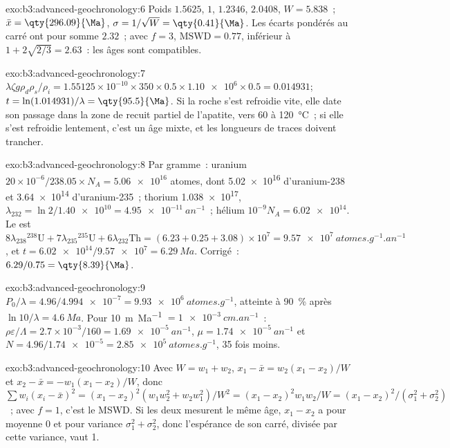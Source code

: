 \begin{solution}{exo:b3:advanced-geochronology:6}
Poids $1.5625$, $1$, $1.2346$, $2.0408$, $W = 5.838$~; $\bar x =
\qty{296.09}{\Ma}$, $\sigma = 1/\sqrt W = \qty{0.41}{\Ma}$. Les écarts pondérés
au carré ont pour somme $2.32$~; avec $f = 3$, $\mathrm{MSWD} = 0.77$, inférieur à
$1 + 2\sqrt{2/3} = 2.63$~: les âges sont compatibles.
\end{solution}

\begin{solution}{exo:b3:advanced-geochronology:7}
$\lambda\zeta g\rho_d\rho_s/\rho_i = 1.55125\times10^{-10}\times350\times0.5
\times\num{1.10e6}\times0.5 = 0.014931$; $t = \ln(1.014931)/\lambda =
\qty{95.5}{\Ma}$. Si la roche s'est refroidie vite, elle date son passage dans la
zone de recuit partiel de l'apatite, vers 60 à \qty{120}{\celsius}~; si elle
s'est refroidie lentement, c'est un âge mixte, et les longueurs de traces doivent trancher.
\end{solution}

\begin{solution}{exo:b3:advanced-geochronology:8}
Par gramme~: uranium $20\times10^{-6}/238.05\times N_A = \num{5.06e16}$ atomes, dont
\num{5.02e16} d'uranium-238 et \num{3.64e14} d'uranium-235~; thorium
\num{1.038e17}, $\lambda_{232} = \ln 2/\num{1.40e10} = \qty{4.95e-11}{an^{-1}}$~;
hélium $10^{-9}N_A = \num{6.02e14}$. Le  est
$8\lambda_{238}{}^{238}\mathrm U + 7\lambda_{235}{}^{235}\mathrm U +
6\lambda_{232}\mathrm{Th} = (6.23 + 0.25 + 3.08)\times10^7 =
\qty{9.57e7}{atomes.g^{-1}.an^{-1}}$, et $t = \num{6.02e14}/\num{9.57e7} =
\qty{6.29}{Ma}$. Corrigé~: $6.29/0.75 = \qty{8.39}{\Ma}$.
\end{solution}

\begin{solution}{exo:b3:advanced-geochronology:9}
$P_0/\lambda = 4.96/\num{4.994e-7} = \qty{9.93e6}{atomes.g^{-1}}$, atteinte à
\qty{90}{\percent} après $\ln 10/\lambda = \qty{4.6}{Ma}$. Pour
\qty{10}{m.Ma^{-1}} $= \qty{1e-3}{cm.an^{-1}}$~: $\rho\varepsilon/\Lambda =
2.7\times10^{-3}/160 = \qty{1.69e-5}{an^{-1}}$, $\mu = \qty{1.74e-5}{an^{-1}}$
et $N = 4.96/\num{1.74e-5} = \qty{2.85e5}{atomes.g^{-1}}$, 35 fois moins.
\end{solution}

\begin{solution}{exo:b3:advanced-geochronology:10}
Avec $W = w_1 + w_2$, $x_1 - \bar x = w_2(x_1 - x_2)/W$ et $x_2 - \bar x =
-w_1(x_1 - x_2)/W$, donc $\sum w_i(x_i - \bar x)^2 = (x_1 - x_2)^2(w_1w_2^2 +
w_2w_1^2)/W^2 = (x_1 - x_2)^2w_1w_2/W = (x_1 - x_2)^2/(\sigma_1^2 +
\sigma_2^2)$~; avec $f = 1$, c'est le MSWD. Si les deux mesurent le même âge,
$x_1 - x_2$ a pour moyenne 0 et pour variance $\sigma_1^2 + \sigma_2^2$, donc
l'espérance de son carré, divisée par cette variance, vaut 1.
\end{solution}

